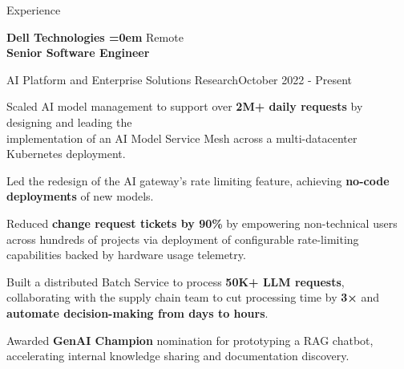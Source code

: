 \documentclass[
	9pt, %
]{resume} %
\begin{document}

\begin{rSection}{Experience}

    \textbf{Dell Technologies {\leftmargin=0em}} \hfill {Remote } \\
    \textbf{Senior Software Engineer}
    \begin{rSubsection}{AI Platform and Enterprise Solutions Research}{October 2022 - Present}
        \item Scaled AI model management to support over \textbf{2M+ daily requests} by designing and leading the \\ implementation of an AI Model Service Mesh across a multi-datacenter Kubernetes deployment.
        \item Led the redesign of the AI gateway’s rate limiting feature, achieving \textbf{no-code deployments} of new models.
        \item Reduced \textbf{change request tickets by 90\%} by empowering non-technical users across hundreds of projects via deployment of configurable rate-limiting capabilities backed by hardware usage telemetry.
        \item Built a distributed Batch Service to process \textbf{50K+ LLM requests}, collaborating with the supply chain team to cut processing time by \textbf{3×} and \textbf{automate decision-making from days to hours}.
        \item Awarded \textbf{GenAI Champion} nomination for prototyping a RAG chatbot, accelerating internal knowledge sharing and documentation discovery.
	\end{rSubsection}



\end{rSection}
\end{document}
